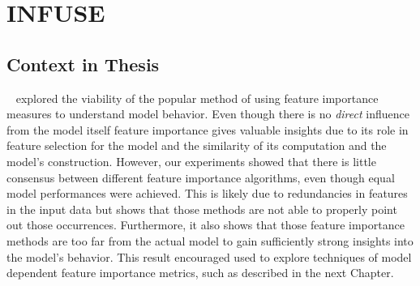 \chapter{INFUSE}
\label{chap:infuse}


\section{Context in Thesis}
\infuse~\cite{infuse} explored the viability of the popular method of using feature importance measures to understand model behavior.
Even though there is no \emph{direct} influence from the model itself feature importance gives valuable insights due to its role in feature selection for the model and the similarity of its computation and the model's construction.
However, our experiments showed that there is little consensus between different feature importance algorithms, even though equal model performances were achieved.
This is likely due to redundancies in features in the input data but shows that those methods are not able to properly point out those occurrences.
Furthermore, it also shows that those feature importance methods are too far from the actual model to gain sufficiently strong insights into the model's behavior.
This result encouraged used to explore techniques of model dependent feature importance metrics, such as \prospector described in the next Chapter.

